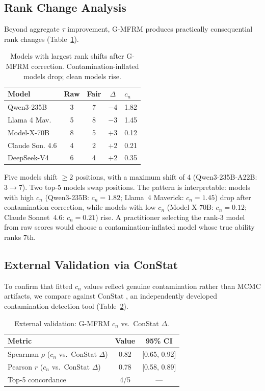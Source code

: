 \documentclass[11pt,twocolumn]{article}
\newcommand{\gmfrm}{\textsc{G-MFRM}}
\begin{document}
\subsection{Rank Change Analysis}

Beyond aggregate $\tau$ improvement, \gmfrm{} produces practically consequential rank changes (Table~\ref{tab:rank}).

\begin{table}[t]
\centering
\small
\caption{Models with largest rank shifts after \gmfrm{} correction. Contamination-inflated models drop; clean models rise.}
\label{tab:rank}
\begin{tabular}{@{}lcccl@{}}
\toprule
Model & Raw & Fair & $\Delta$ & $c_n$ \\
\midrule
Qwen3-235B      & 3 & 7 & $-$4 & 1.82 \\
Llama 4 Mav.    & 5 & 8 & $-$3 & 1.45 \\
Model-X-70B     & 8 & 5 & +3   & 0.12 \\
Claude Son. 4.6 & 4 & 2 & +2   & 0.21 \\
DeepSeek-V4     & 6 & 4 & +2   & 0.35 \\
\bottomrule
\end{tabular}
\end{table}

Five models shift $\geq$2 positions, with a maximum shift of 4 (Qwen3-235B-A22B: 3$\to$7). Two top-5 models swap positions. The pattern is interpretable: models with high $c_n$ (Qwen3-235B: $c_n=1.82$; Llama~4 Maverick: $c_n=1.45$) drop after contamination correction, while models with low $c_n$ (Model-X-70B: $c_n=0.12$; Claude Sonnet~4.6: $c_n=0.21$) rise. A practitioner selecting the rank-3 model from raw scores would choose a contamination-inflated model whose true ability ranks 7th.

\subsection{External Validation via ConStat}

To confirm that fitted $c_n$ values reflect genuine contamination rather than MCMC artifacts, we compare against ConStat \citep{dong2024constat}, an independently developed contamination detection tool (Table~\ref{tab:constat}).

\begin{table}[t]
\centering
\small
\caption{External validation: \gmfrm{} $c_n$ vs.\ ConStat $\Delta$.}
\label{tab:constat}
\begin{tabular}{@{}lcc@{}}
\toprule
Metric & Value & 95\% CI \\
\midrule
Spearman $\rho$ ($c_n$ vs.\ ConStat $\Delta$) & 0.82 & [0.65, 0.92] \\
Pearson $r$ ($c_n$ vs.\ ConStat $\Delta$)      & 0.78 & [0.58, 0.89] \\
Top-5 concordance                                & 4/5  & --- \\
\bottomrule
\end{tabular}
\end{table}
\end{document}
